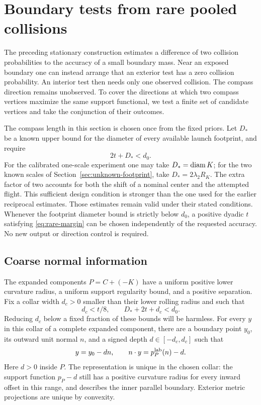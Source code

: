 \section{Boundary tests from rare pooled collisions}
\label{sec:rare-stationary}
The preceding stationary construction estimates a difference of two
collision probabilities to the accuracy of a small boundary mass.
Near an exposed boundary one can instead arrange that an exterior
test has a zero collision probability. An interior test then needs only
one observed collision. The compass direction remains unobserved.
To cover the directions at which two compass vertices maximize the same
support functional, we test a finite set of candidate vertices and take
the conjunction of their outcomes.

The compass length in this section is chosen once from the fixed
priors. Let $D_*$ be a known upper bound for the diameter of every
available launch footprint, and require
\begin{equation}\label{eq:rare-margin}
                         2t+D_*<d_0.
\end{equation}
For the calibrated one-scale experiment one may take $D_*=\operatorname{diam} K$;
for the two known scales of Section~\ref{sec:unknown-footprint}, take
$D_*=2\lambda_2R_K$. The extra factor of two accounts for both the
shift of a nominal center and the attempted flight. This sufficient
design condition is stronger than the one used for the earlier
reciprocal estimates. Those estimates remain valid under their stated
conditions. Whenever the footprint diameter bound is strictly below
$d_0$, a positive dyadic $t$ satisfying \eqref{eq:rare-margin} can be
chosen independently of the requested accuracy. No new output or
direction control is required.

\subsection{Coarse normal information}
The expanded components $P=C+(-K)$ have a uniform positive lower
curvature radius, a uniform support regularity bound, and a positive
separation. Fix a collar width $d_c>0$ smaller than their lower rolling
radius and such that
\begin{equation}\label{eq:rare-collar}
            d_c<t/8,\qquad D_*+2t+d_c<d_0.
\end{equation}
Reducing $d_c$ below a fixed fraction of these bounds will be harmless.
For every $y$ in this collar of a complete expanded component, there
are a boundary point $y_0$, its outward unit normal $n$, and a signed
depth $d\in[-d_c,d_c]$ such that
\begin{equation}\label{eq:rare-signed-depth}
              y=y_0-dn,\qquad n\cdot y=p_P^{\rm lab}(n)-d.
\end{equation}
Here $d>0$ inside $P$. The representation is unique in the chosen
collar: the support function $p_P-d$ still has a positive curvature
radius for every inward offset in this range, and describes the inner
parallel boundary. Exterior metric projections are unique by convexity.

